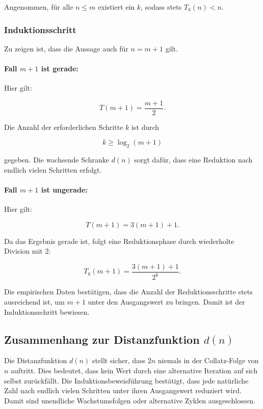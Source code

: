 \documentclass[a4paper,12pt]{article}
\begin{document}
Angenommen, für alle \( n \leq m \) existiert ein \( k \), sodass stets \( T_k(n) < n \).

\subsubsection{Induktionsschritt}

Zu zeigen ist, dass die Aussage auch für \( n = m + 1 \) gilt.

\paragraph{Fall \( m + 1 \) ist gerade:}

Hier gilt:

\[
T(m + 1) = \frac{m + 1}{2}.
\]

Die Anzahl der erforderlichen Schritte \( k \) ist durch

\[
k \geq \log_2(m + 1)
\]

gegeben. Die wachsende Schranke \( d(n) \) sorgt dafür, dass eine Reduktion nach endlich vielen Schritten erfolgt.

\paragraph{Fall \( m + 1 \) ist ungerade:}

Hier gilt:

\[
T(m + 1) = 3(m + 1) + 1.
\]

Da das Ergebnis gerade ist, folgt eine Reduktionsphase durch wiederholte Division mit 2:

\[
T_k(m + 1) = \frac{3(m + 1) + 1}{2^k}.
\]

Die empirischen Daten bestätigen, dass die Anzahl der Reduktionsschritte stets ausreichend ist, um \( m + 1 \) unter den Ausgangswert zu bringen. Damit ist der Induktionsschritt bewiesen.

\subsection{Zusammenhang zur Distanzfunktion \( d(n) \)}

Die Distanzfunktion \( d(n) \) stellt sicher, dass \( 2n \) niemals in der Collatz-Folge von \( n \) auftritt. Dies bedeutet, dass kein Wert durch eine alternative Iteration auf sich selbst zurückfällt. Die Induktionsbeweisführung bestätigt, dass jede natürliche Zahl nach endlich vielen Schritten unter ihren Ausgangswert reduziert wird. Damit sind unendliche Wachstumsfolgen oder alternative Zyklen ausgeschlossen.
\end{document}
